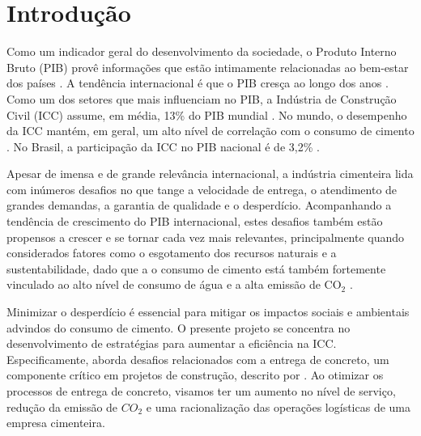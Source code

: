 \chapter{Introdução}
Como um indicador geral do desenvolvimento da sociedade, o Produto Interno Bruto (PIB)  provê informações que estão intimamente relacionadas ao bem-estar dos países \citep{gdpValidity}. A tendência internacional é que o PIB cresça ao longo dos anos \citep{oecd2024realgdp}. Como um dos setores que mais influenciam no PIB, a Indústria de Construção Civil (ICC) assume, em média, 13\% do PIB mundial \citep{mckinsey,fontereserva}.
No mundo, o desempenho da ICC mantém, em geral, um alto nível de correlação com o consumo de cimento \citep{globbulk}. No Brasil, a participação da ICC no PIB nacional é de 3,2\% \citep{SNIC2022}. 

Apesar de imensa e de grande relevância internacional, a indústria cimenteira lida com inúmeros desafios no que tange a velocidade de entrega, o atendimento de grandes demandas, a garantia de qualidade e o desperdício. Acompanhando a tendência de crescimento do PIB internacional, estes desafios também estão propensos a crescer e se tornar cada vez mais relevantes, principalmente quando considerados fatores como o esgotamento dos recursos naturais e a sustentabilidade, dado que a o consumo de cimento está também fortemente vinculado ao alto nível de consumo de água e a alta emissão de CO$_2$ \citep{Watts2019Concrete}.

Minimizar o desperdício é essencial para mitigar os impactos sociais e ambientais advindos do consumo de cimento. O presente projeto se concentra no desenvolvimento de estratégias para aumentar a eficiência na ICC. Especificamente, aborda desafios relacionados com a entrega de concreto, um componente crítico em projetos de construção, descrito por \cite{kinable}. Ao otimizar os processos de entrega de concreto, 
visamos ter um aumento no nível de serviço, redução
da emissão de $CO_2$ e uma racionalização das operações logísticas
de uma empresa cimenteira.


